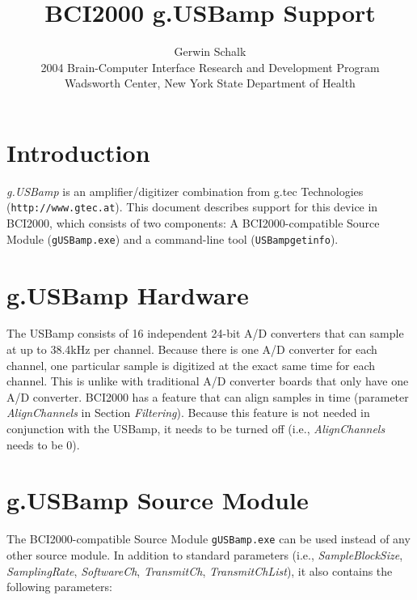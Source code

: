 \documentclass[letterpaper, oneside, 12pt]{article}
\newcommand{\ie}{i.e.,}
\begin{document}
%
\title{BCI2000 g.USBamp Support}
\author{Gerwin Schalk\\ \small{2004 Brain-Computer Interface Research and Development Program}\\ \small{Wadsworth Center, New York State Department of Health}}
\maketitle

\tableofcontents

\newpage


\section{Introduction}

\sloppypar \emph{g.USBamp} is an amplifier/digitizer combination from g.tec 
Technologies (\texttt{http://www.gtec.at}). This document describes support for 
this device in BCI2000, which consists of two components: A BCI2000-compatible 
Source Module (\texttt{gUSBamp.exe}) and a command-line tool 
(\texttt{USBampgetinfo}). 

\section{g.USBamp Hardware}

The USBamp consists of 16 independent 24-bit A/D converters that can sample at 
up to 38.4kHz per channel. Because there is one A/D converter for each channel, 
one particular sample is digitized at the exact same time for each channel. This 
is unlike with traditional A/D converter boards that only have one A/D 
converter. BCI2000 has a feature that can align samples in time (parameter 
\emph{AlignChannels} in Section \emph{Filtering}). Because this feature is not 
needed in conjunction with the USBamp, it needs to be turned off (i.e., 
\emph{AlignChannels} needs to be 0).


\section{g.USBamp Source Module}

The BCI2000-compatible Source Module \texttt{gUSBamp.exe} can be used instead of 
any other source module. In addition to standard parameters (\ie{} 
\emph{SampleBlockSize}, \emph{SamplingRate}, \emph{SoftwareCh}, 
\emph{TransmitCh}, \emph{TransmitChList}), it also contains the following 
parameters:
\end{document}
